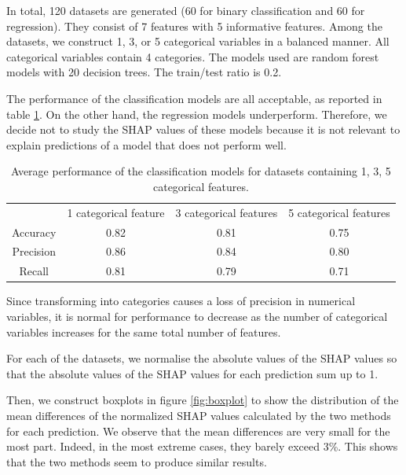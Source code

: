 \documentclass[11pt]{article}
\begin{document}
In total, 120 datasets are generated (60 for binary classification and 60 for regression). They consist of 7 
features with 5 informative features. Among the datasets, we construct 1, 3, or 5 categorical variables in a 
balanced manner. All categorical variables contain 4 categories. The models used are random forest models with 
20 decision trees. The train/test ratio is 0.2.

The performance of the classification models are all acceptable, as reported in table \ref{table:perfo}. On the other hand, 
the regression models underperform. Therefore, we decide not to study the SHAP values of these models because 
it is not relevant to explain predictions of a model that does not perform well.

\begin{table}[H]
    \centering
    \begin{tabular}{cccc}
      \midrule
      & 1 categorical feature & 3 categorical features & 5 categorical features \\
      Accuracy & 0.82 & 0.81 & 0.75 \\
      Precision & 0.86 & 0.84 & 0.80 \\
      Recall & 0.81 & 0.79 & 0.71 \\
      \bottomrule
    \end{tabular}
    \caption{Average performance of the classification models for datasets containing 
    1, 3, 5 categorical features.}
    \label{table:perfo}
  \end{table}

Since transforming into categories causes a loss of precision in numerical variables, 
it is normal for performance to decrease as the number of categorical variables increases 
for the same total number of features.

For each of the datasets, we normalise the absolute values of the SHAP values so that the 
absolute values of the SHAP values for each prediction sum up to 1.

Then, we construct boxplots in figure \ref{fig:boxplot} to show the distribution of the mean differences of the 
normalized SHAP values calculated by the two methods for each prediction. We observe that the mean differences 
are very small for the most part. Indeed, in the most extreme cases, they barely exceed 3\%. This shows that 
the two methods seem to produce similar results.
\end{document}
